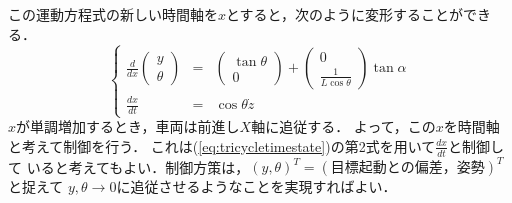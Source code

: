 この運動方程式の新しい時間軸を$x$とすると，次のように変形することができ
る．
\begin{equation}
 \left\{
  \begin{array}{rcl}
   \displaystyle \frac{d}{dx}
    \left(
     \begin{array}{c}
      y \\
      \theta 
     \end{array}
    \right) &=&
    \left(
     \begin{array}{c}
      \tan \theta \\
      0 
     \end{array}
    \right) +
    \left(
     \begin{array}{c}
      0 \\
      \frac{1}{L \cos \theta}
     \end{array}
    \right) \tan \alpha \\
 \displaystyle \frac{dx}{dt} &=& \cos \theta \dot{z}
  \end{array}\right.
 \label{eq:tricycletimestate}
\end{equation}
$x$が単調増加するとき，車両は前進し$X$軸に追従する．
よって，この$x$を時間軸と考えて制御を行う．
これは(\ref{eq:tricycletimestate})の第2式を用いて$\frac{dx}{dt}$と制御して
いると考えてもよい．制御方策は，$(y, \theta)^T = (目標起動との偏差，姿勢)^T$
と捉えて
$y, \theta \rightarrow 0$に追従させるようなことを実現すればよい．

